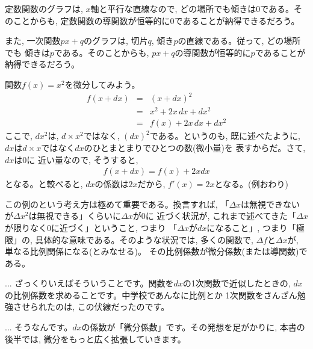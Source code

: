 定数関数のグラフは, $x$軸と平行な直線なので, どの場所でも傾きは0である。そのことからも, 
定数関数の導関数が恒等的に0であることが納得できるだろう。

また, 一次関数$px+q$のグラフは, 切片$q$, 傾き$p$の直線である。従って, どの場所でも
傾きは$p$である。そのことからも, $px+q$の導関数が恒等的に$p$であることが納得できるだろう。

\begin{exmpl}\label{ex:x2deriv} 関数$f(x)=x^2$を微分してみよう。
\begin{eqnarray*}
f(x+dx) & = & (x+dx)^2\\
        & = & x^2+2x\,dx +dx^2\\
        & = & f(x)+2x\,dx +dx^2
\end{eqnarray*}
ここで, $dx^2$は, $d\times x^2$ではなく, $(dx)^2$である。というのも, 
既に述べたように, $dx$は$d\times x$ではなく$dx$のひとまとまりでひとつの数(微小量)を
表すからだ。さて, $dx$は0に
近い量なので,  そうすると, 
\begin{eqnarray}f(x+dx)=f(x)+2xdx\end{eqnarray}
となる。と較べると, $dx$の係数は$2x$だから, $f'(x)=2x$となる。(例おわり)\end{exmpl}
\hv

この例のという考え方は極めて重要である。換言すれば, 
「$\Delta x$は無視できないが$\Delta x^2$は無視できる」くらいに$\Delta x$が0に
近づく状況が, これまで述べてきた「$\Delta x$が限りなく0に近づく」ということ, つまり
「$\Delta x$が$dx$になること」, つまり「極限」の, 具体的な意味である。そのような状況では, 
多くの関数で, $\Delta f$と$\Delta x$が, 単なる比例関係になる(とみなせる)。
その比例係数が微分係数(または導関数)である。\mv

\begin{faq}{\small {}
... ざっくりいえばそういうことです。関数を$dx$の1次関数で近似したときの, 
$dx$の比例係数を求めることです。中学校であんなに比例とか
1次関数をさんざん勉強させられたのは, この伏線だったのです。}\end{faq}

\begin{faq}{\small{}
... そうなんです。$dx$の係数が「微分係数」です。その発想を足がかりに, 
本書の後半では, 微分をもっと広く拡張していきます。}\end{faq}

